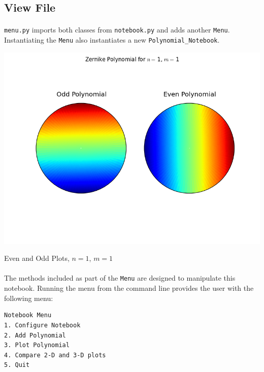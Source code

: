 \documentclass{tufte-handout}
\begin{document}
\subsection{View File}

\paragraph{}\Verb|menu.py| imports both classes from \Verb|notebook.py| and adds another \Verb|Menu|.  Instantiating the \Verb|Menu| also instantiates a new \Verb|Polynomial_Notebook|.  

\begin{marginfigure}%
  \includegraphics[width=\linewidth]{img/1-1.png}
  \caption{Even and Odd Plots, $n=1$, $m=1$}
\end{marginfigure}

\paragraph{}The methods included as part of the \Verb|Menu| are designed to manipulate this notebook.  Running the menu from the command line provides the user with the following menu:

\begin{verbatim}
Notebook Menu
1. Configure Notebook
2. Add Polynomial
3. Plot Polynomial 
4. Compare 2-D and 3-D plots
5. Quit 
\end{verbatim}
\end{document}
